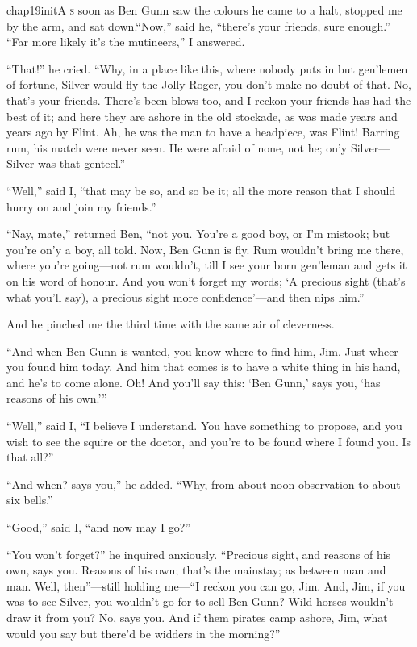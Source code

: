 
   \lettrine[lines=4,image=true]{chap19initA}{ s} soon as Ben Gunn saw the colours he came to a halt, stopped me by the arm, and sat down.\enquote{Now,} said he, \enquote{there’s your friends, sure enough.} \enquote{Far more likely it’s the mutineers,} I answered.

\enquote{That!} he cried. \enquote{Why, in a place like this, where nobody puts in but gen’lemen of fortune, Silver would fly the Jolly Roger, you don’t make no doubt of that. No, that’s your friends. There’s been blows too, and I reckon your friends has had the best of it; and here they are ashore in the old stockade, as was made years and years ago by Flint. Ah, he was the man to have a headpiece, was Flint! Barring rum, his match were never seen. He were afraid of none, not he; on’y Silver---Silver was that genteel.}

\enquote{Well,} said I, \enquote{that may be so, and so be it; all the more reason that I should hurry on and join my friends.}

\enquote{Nay, mate,} returned Ben, \enquote{not you. You’re a good boy, or I’m mistook; but you’re on’y a boy, all told. Now, Ben Gunn is fly. Rum wouldn’t bring me there, where you’re going---not rum wouldn’t, till I see your born gen’leman and gets it on his word of honour. And you won’t forget my words; ‘A precious sight (that’s what you’ll say), a precious sight more confidence’---and then nips him.}

And he pinched me the third time with the same air of cleverness.

\enquote{And when Ben Gunn is wanted, you know where to find him, Jim. Just wheer you found him today. And him that comes is to have a white thing in his hand, and he’s to come alone. Oh! And you’ll say this: ‘Ben Gunn,’ says you, ‘has reasons of his own.’}

\enquote{Well,} said I, \enquote{I believe I understand. You have something to propose, and you wish to see the squire or the doctor, and you’re to be found where I found you. Is that all?}

\enquote{And when? says you,} he added. \enquote{Why, from about noon observation to about six bells.}

\enquote{Good,} said I, \enquote{and now may I go?}

\enquote{You won’t forget?} he inquired anxiously. \enquote{Precious sight, and reasons of his own, says you. Reasons of his own; that’s the mainstay; as between man and man. Well, then}---still holding me---\enquote{I reckon you can go, Jim. And, Jim, if you was to see Silver, you wouldn’t go for to sell Ben Gunn? Wild horses wouldn’t draw it from you? No, says you. And if them pirates camp ashore, Jim, what would you say but there’d be widders in the morning?}


